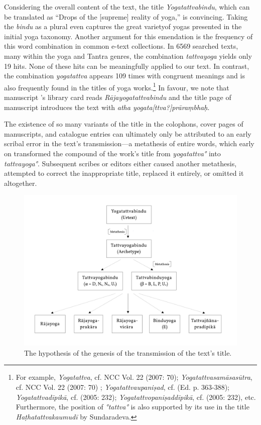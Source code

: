 Considering the overall content of the text, the title \textit{Yogatattvabindu}, which can be translated as ``Drops of the [supreme] reality of yoga,'' is convincing. Taking the \textit{bindu} as a plural even captures the great varietyof yogas presented in the initial yoga taxonomy. Another argument for this emendation is the frequency of this word combination in common e-text collections. In 6569 searched texts, many within the yoga and Tantra genres, the combination \textit{tattvayoga} yields only 19 hits. None of these hits can be meaningfully applied to our text. In contrast, the combination \textit{yogatattva} appears 109 times with congruent meanings and is also frequently found in the titles of yoga works.\footnote{For example, \emph{Yogatattva}, cf. NCC Vol. 22 (2007: 70); \emph{Yogatattvasamāsasūtra}, cf. NCC Vol. 22 (2007: 70) \nocite{newcataloguscatalogorum22}; \emph{Yogatattvaupaniṣad}, cf.  (Ed. p. 363-388); \emph{Yogatattvadīpikā}, cf.  (2005: 232); \emph{Yogatattvopaniṣaddīpikā}, cf.  (2005: 232), etc. Furthermore, the position of \emph{°tattva°} is also supported by its use in the title \emph{Haṭhatattvakaumudī} by Sundaradeva.} In favour, we note that manuscript 's library card reads \textit{Rājayogatattvabindu} and the title page of manuscript  introduces the text with \textit{atha yogata[ttva?]prāraṃbhaḥ}. 

The existence of so many variants of the title in the colophons, cover pages of manuscripts, and catalogue entries can ultimately only be attributed to an early scribal error in the text's transmission—a metathesis of entire words, which early on transformed the compound of the work's title from \textit{yogatattva°} into \textit{tattvayoga°}. Subsequent scribes or editors either caused another metathesis, attempted to correct the inappropriate title, replaced it entirely, or omitted it altogether.

  \begin{figure}[h!]
    \centering
    \includegraphics[width=1\textwidth]{pics/titel-hypothese.pdf} %
    \caption{The hypothesis of the genesis of the transmission of the text's title.}
    \label{fig:titel-hypothese}
\end{figure}

